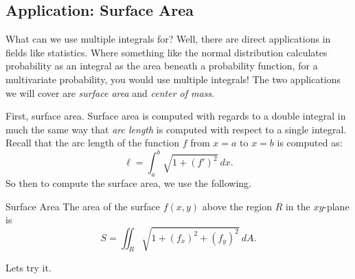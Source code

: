 \subsection{Application: Surface Area}
What can we use multiple integrals for? Well, there are direct applications in fields like statistics. Where something like the normal distribution calculates probability as an integral as the area beneath a probability function, for a multivariate probability, you would use multiple integrals! The two applications we will cover are \textit{surface area} and \textit{center of mass}.

First, surface area. Surface area is computed with regards to a double integral in much the same way that \textit{arc length} is computed with respect to a single integral. Recall that the arc length of the function $f$ from $x=a$ to $x=b$ is computed as:
$$\ell=\int_a^b \sqrt{1+(f')^2}\ dx. $$
So then to compute the surface area, we use the following.

\begin{definition}{\hypertarget{surfarea}{Surface Area}}
The area of the surface $f(x,y)$ above the region $R$ in the $xy$-plane is $$S=\iint_R \sqrt{1+(f_x)^2+(f_y)^2}\ dA. $$
\end{definition}

Lets try it.

